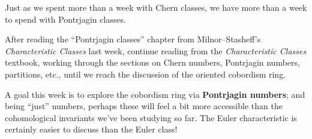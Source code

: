 \documentclass{homework}
\author{Jim Fowler}
\date{Week 13: Cobordism ring}
\begin{document}
\maketitle

Just as we spent more than a week with Chern classes, we have more than a week to spend with Pontrjagin classes.

After reading the ``Pontrjagin classes'' chapter from
Milnor--Stasheff's \textit{Characteristic Classes} last week, continue
reading from the \textit{Characteristic Classes} textbook, working
through the sections on Chern numbers, Pontrjagin numbers, partitions,
etc., until we reach the discussion of the oriented cobordism ring.

A goal this week is to explore the cobordism ring via
\textbf{Pontrjagin numbers}; and being ``just'' numbers, perhaps these
will feel a bit more accessible than the cohomological invariants
we've been studying so far. The Euler characteristic is certainly
easier to discuss than the Euler class!
\end{document}
